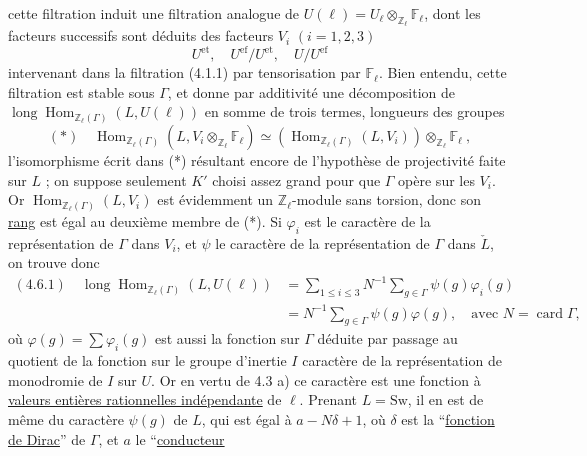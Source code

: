 cette filtration induit une filtration analogue de $U(\ell)=U_\ell\otimes_{\mathbb Z_\ell}\mathbb F_\ell$, dont les facteurs successifs sont déduits des facteurs $V_i$ $(i=1,2,3)$
\[
 U^{\mathrm{et}},\quad U^{\mathrm{ef}}/U^{\mathrm{et}},\quad U/U^{\mathrm{ef}}
\]
intervenant dans la filtration (4.1.1) par tensorisation par $\mathbb F_\ell$. Bien entendu, cette filtration est stable sous $\Gamma$, et donne par additivité une décomposition de $\operatorname{long}\operatorname{Hom}_{\mathbb Z_\ell(\Gamma)}(L,U(\ell))$ en somme de trois termes, longueurs des groupes
\[
 (*)\quad\operatorname{Hom}_{\mathbb Z_\ell(\Gamma)}(L,V_i\otimes_{\mathbb Z_\ell}\mathbb F_\ell)
 \simeq(\operatorname{Hom}_{\mathbb Z_\ell(\Gamma)}(L,V_i))\otimes_{\mathbb Z_\ell}\mathbb F_\ell\ ,
\]
l'isomorphisme écrit dans (*) résultant encore de l'hypothèse de projectivité faite sur $L$ ; on suppose seulement $K'$ choisi assez grand pour que $\Gamma$ opère sur les $V_i$. Or $\operatorname{Hom}_{\mathbb Z_\ell(\Gamma)}(L,V_i)$ est évidemment un $\mathbb Z_\ell$-module sans torsion, donc son \uline{rang} est égal au deuxième membre de (*). Si $\varphi_i$ est le caractère de la représentation de $\Gamma$ dans $V_i$, et $\psi$ le caractère de la représentation de $\Gamma$ dans $\check L$, on trouve donc
\[
 \begin{aligned}
 (4.6.1)\quad\operatorname{long}\operatorname{Hom}_{\mathbb Z_\ell(\Gamma)}(L,U(\ell))
 &=\sum_{1\leq i\leq3}N^{-1}\sum_{g\in\Gamma}\psi(g)\varphi_i(g)\\
 &=N^{-1}\sum_{g\in\Gamma}\psi(g)\varphi(g),\quad\text{avec }N=\operatorname{card}\Gamma,
 \end{aligned}
\]
où $\varphi(g)=\sum\varphi_i(g)$ est aussi la fonction sur $\Gamma$ déduite par passage au quotient de la fonction sur le groupe d'inertie $I$ caractère de la représentation de monodromie de $I$ sur $U$. Or en vertu de 4.3 a) ce caractère est une fonction à \uline{valeurs entières rationnelles indépendante} de $\ell$.
Prenant $L=\mathrm{Sw}$, il en est de même du caractère $\psi(g)$ de $L$, qui est égal à $a-N\delta+1$, où $\delta$ est la ``\uline{fonction de Dirac}'' de $\Gamma$, et $a$ le ``\uline{conducteur}
